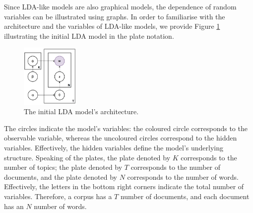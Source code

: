 \documentclass{mpaper}
\begin{document}
\par Since LDA-like models are also graphical models, the dependence of random variables can be illustrated using graphs. In order to familiarise with the architecture and the variables of LDA-like models, we provide Figure \ref{fig:arch_LDA-init} illustrating the initial LDA model in the plate notation.
\begin{figure}[h]
  \centering
  \includegraphics[width=0.25\textwidth]{LDA-initial.png}
  \caption{The initial LDA model's architecture.}
  \label{fig:arch_LDA-init}
\end{figure}
The circles indicate the model's variables: the coloured circle corresponds to the observable variable, whereas the uncoloured circles correspond to the hidden variables. Effectively, the hidden variables define the model's underlying structure. Speaking of the plates, the plate denoted by $K$ corresponds to the number of topics; the plate denoted by $T$ corresponds to the number of documents, and the plate denoted by $N$ corresponds to the number of words. Effectively, the letters in the bottom right corners indicate the total number of variables. Therefore, a corpus has a $T$ number of documents, and each document has an $N$ number of words.
\end{document}
